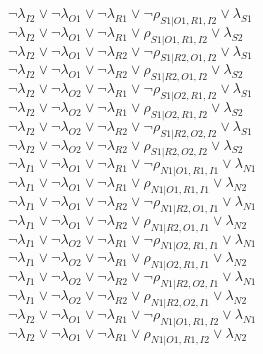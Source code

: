 $\neg\lambda_{I2} \vee \neg\lambda_{O1} \vee \neg\lambda_{R1} \vee \neg\rho_{S1|O1,R1,I2} \vee \lambda_{S1}$\\
$\neg\lambda_{I2} \vee \neg\lambda_{O1} \vee \neg\lambda_{R1} \vee \rho_{S1|O1,R1,I2} \vee \lambda_{S2}$\\
$\neg\lambda_{I2} \vee \neg\lambda_{O1} \vee \neg\lambda_{R2} \vee \neg\rho_{S1|R2,O1,I2} \vee \lambda_{S1}$\\
$\neg\lambda_{I2} \vee \neg\lambda_{O1} \vee \neg\lambda_{R2} \vee \rho_{S1|R2,O1,I2} \vee \lambda_{S2}$\\
$\neg\lambda_{I2} \vee \neg\lambda_{O2} \vee \neg\lambda_{R1} \vee \neg\rho_{S1|O2,R1,I2} \vee \lambda_{S1}$\\
$\neg\lambda_{I2} \vee \neg\lambda_{O2} \vee \neg\lambda_{R1} \vee \rho_{S1|O2,R1,I2} \vee \lambda_{S2}$\\
$\neg\lambda_{I2} \vee \neg\lambda_{O2} \vee \neg\lambda_{R2} \vee \neg\rho_{S1|R2,O2,I2} \vee \lambda_{S1}$\\
$\neg\lambda_{I2} \vee \neg\lambda_{O2} \vee \neg\lambda_{R2} \vee \rho_{S1|R2,O2,I2} \vee \lambda_{S2}$\\
$\neg\lambda_{I1} \vee \neg\lambda_{O1} \vee \neg\lambda_{R1} \vee \neg\rho_{N1|O1,R1,I1} \vee \lambda_{N1}$\\
$\neg\lambda_{I1} \vee \neg\lambda_{O1} \vee \neg\lambda_{R1} \vee \rho_{N1|O1,R1,I1} \vee \lambda_{N2}$\\
$\neg\lambda_{I1} \vee \neg\lambda_{O1} \vee \neg\lambda_{R2} \vee \neg\rho_{N1|R2,O1,I1} \vee \lambda_{N1}$\\
$\neg\lambda_{I1} \vee \neg\lambda_{O1} \vee \neg\lambda_{R2} \vee \rho_{N1|R2,O1,I1} \vee \lambda_{N2}$\\
$\neg\lambda_{I1} \vee \neg\lambda_{O2} \vee \neg\lambda_{R1} \vee \neg\rho_{N1|O2,R1,I1} \vee \lambda_{N1}$\\
$\neg\lambda_{I1} \vee \neg\lambda_{O2} \vee \neg\lambda_{R1} \vee \rho_{N1|O2,R1,I1} \vee \lambda_{N2}$\\
$\neg\lambda_{I1} \vee \neg\lambda_{O2} \vee \neg\lambda_{R2} \vee \neg\rho_{N1|R2,O2,I1} \vee \lambda_{N1}$\\
$\neg\lambda_{I1} \vee \neg\lambda_{O2} \vee \neg\lambda_{R2} \vee \rho_{N1|R2,O2,I1} \vee \lambda_{N2}$\\
$\neg\lambda_{I2} \vee \neg\lambda_{O1} \vee \neg\lambda_{R1} \vee \neg\rho_{N1|O1,R1,I2} \vee \lambda_{N1}$\\
$\neg\lambda_{I2} \vee \neg\lambda_{O1} \vee \neg\lambda_{R1} \vee \rho_{N1|O1,R1,I2} \vee \lambda_{N2}$\\
